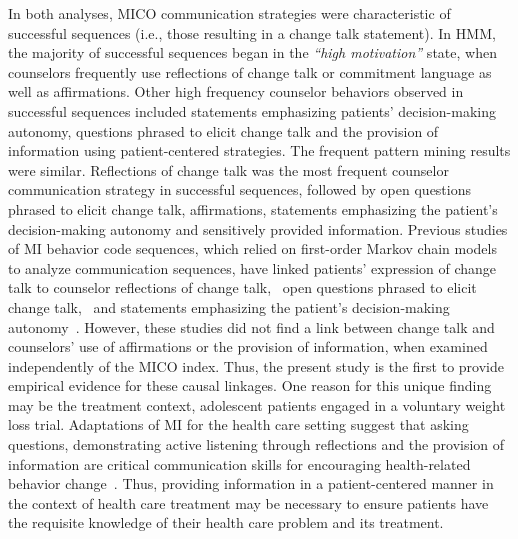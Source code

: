 In both analyses, MICO communication strategies were characteristic of successful sequences (i.e., those resulting in a change talk statement). In HMM, the majority of successful sequences began in the \textit{``high motivation''} state, when counselors frequently use reflections of change talk or commitment language as well as affirmations. Other high frequency counselor behaviors observed in successful sequences included statements emphasizing patients' decision-making autonomy, questions phrased to elicit change talk and the provision of information using patient-centered strategies. The frequent pattern mining results were similar. Reflections of change talk was the most frequent counselor communication strategy in successful sequences, followed by open questions phrased to elicit change talk, affirmations, statements emphasizing the patient's decision-making autonomy and sensitively provided information. Previous studies of MI behavior code sequences, which relied on first-order Markov chain models to analyze communication sequences, have linked patients' expression of change talk to counselor reflections of change talk,~\cite{moyers2009session, gaume2010counselor, glynn2014change, carcone2013provider, jacques2016building} open questions phrased to elicit change talk,~\cite{moyers2009session, carcone2013provider, jacques2016building} and statements emphasizing the patient's decision-making autonomy~\cite{carcone2013provider, jacques2016building}. However, these studies did not find a link between change talk and counselors' use of affirmations or the provision of information, when examined independently of the MICO index. Thus, the present study is the first to provide empirical evidence for these causal linkages. One reason for this unique finding may be the treatment context, adolescent patients engaged in a voluntary weight loss trial. Adaptations of MI for the health care setting suggest that asking questions, demonstrating active listening through reflections and the provision of information are critical communication skills for encouraging health-related behavior change~\cite{douaihy2015motivational}. Thus, providing information in a patient-centered manner in the context of health care treatment may be necessary to ensure patients have the requisite knowledge of their health care problem and its treatment. 

